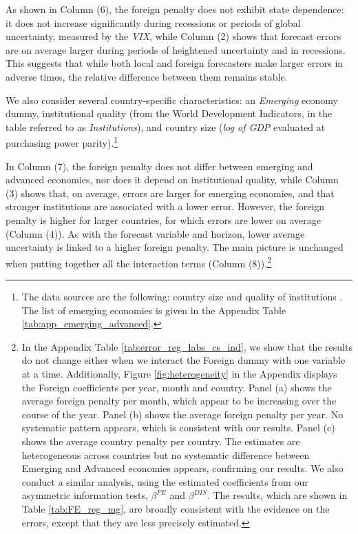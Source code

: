 As shown in Column (6), the foreign penalty does not exhibit state dependence: it does not increase significantly during recessions or periods of global uncertainty, measured by the \textit{VIX}, while Column (2) shows that forecast errors are on average larger during periods of heightened uncertainty and in recessions. This suggests that while both local and foreign forecasters make larger errors in adverse times, the relative difference between them remains stable.

We also consider several country-specific characteristics: an \textit{Emerging} economy dummy, institutional quality (from the World Development Indicators, in the table referred to as \textit{Institutions}), and country size (\textit{log of GDP }evaluated at purchasing power parity).\footnote{The data sources are the following: country size \citep{cpigravity22} and quality of institutions \citep{wdi22}. The list of emerging economies is given in the Appendix Table \ref{tab:app_emerging_advanced}.}



In Column (7), the foreign penalty does not differ between emerging and advanced economies, nor does it depend on institutional quality, while Column (3) shows that, on average, errors are larger for emerging economies, and that stronger institutions are associated with a lower error. However, the foreign penalty is higher for larger countries, for which errors are lower on average (Column (4)). As with the forecast variable and horizon, lower average uncertainty is linked to a higher foreign penalty. The main picture is unchanged when putting together all the interaction terms (Column (8)).\footnote{In the Appendix Table \ref{tab:error_reg_labs_cs_ind}, we show that the results do not change either when we interact the Foreign dummy with one variable at a time. Additionally, Figure \ref{fig:heterogeneity} in the Appendix displays the Foreign coefficients per year, month and country. Panel (a) shows the average foreign penalty per month, which appear to be increasing over the course of the year. Panel (b) shows the average foreign penalty per year. No systematic pattern appears, which is consistent with our results. Panel (c) shows the average country penalty per country. The estimates are heterogeneous across countries but no systematic difference between Emerging and Advanced economies appears, confirming our results. We also conduct a similar analysis, using the estimated coefficients from our asymmetric information tests, $\beta^{FE}$ and $\beta^{DIS}$. The results, which are shown in Table \ref{tab:FE_reg_mg}, are broadly consistent with the evidence on the errors, except that they are less precisely estimated.}

